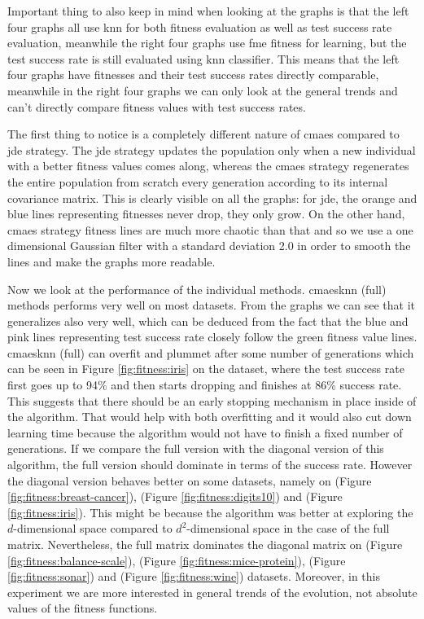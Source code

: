 \documentclass[12pt,a4paper]{report}
\begin{document}
Important thing to also keep in mind when looking at the graphs is that the left four graphs all use \ac{knn} for both fitness evaluation as well as test success rate evaluation, meanwhile the right four graphs use \ac{fme} fitness for learning, but the test success rate is still evaluated using \ac{knn} classifier. This means that the left four graphs have fitnesses and their test success rates directly comparable, meanwhile in the right four graphs we can only look at the general trends and can't directly compare fitness values with test success rates.

The first thing to notice is a completely different nature of \ac{cmaes} compared to \ac{jde} strategy. The \ac{jde} strategy updates the population only when a new individual with a better fitness values comes along, whereas the \ac{cmaes} strategy regenerates the entire population from scratch every generation according to its internal covariance matrix. This is clearly visible on all the graphs: for \ac{jde}, the orange and blue lines representing fitnesses never drop, they only grow. On the other hand, \ac{cmaes} strategy fitness lines are much more chaotic than that and so we use a one dimensional Gaussian filter with a standard deviation 2.0 in order to smooth the lines and make the graphs more readable. 

Now we look at the performance of the individual methods. \ac{cmaesknn} (full) methods performs very well on most datasets. From the graphs we can see that it generalizes also very well, which can be deduced from the fact that the blue and pink lines representing test success rate closely follow the green fitness value lines. \ac{cmaesknn} (full) can overfit and plummet after some number of generations which can be seen in Figure \ref{fig:fitness:iris} on the  dataset, where the test success rate first goes up to 94\% and then starts dropping and finishes at 86\% success rate. This suggests that there should be an early stopping mechanism in place inside of the algorithm. That would help with both overfitting and it would also cut down learning time because the algorithm would not have to finish a fixed number of generations. If we compare the full version with the diagonal version of this algorithm, the full version should dominate in terms of the success rate. However the diagonal version behaves  better on some datasets, namely on  (Figure \ref{fig:fitness:breast-cancer}),  (Figure \ref{fig:fitness:digits10}) and  (Figure \ref{fig:fitness:iris}). This might be because the algorithm was better at exploring the $d$-dimensional space compared to $d^2$-dimensional space in the case of the full matrix. Nevertheless, the full matrix dominates the diagonal matrix on  (Figure \ref{fig:fitness:balance-scale}),  (Figure \ref{fig:fitness:mice-protein}),  (Figure \ref{fig:fitness:sonar}) and  (Figure \ref{fig:fitness:wine}) datasets. Moreover, in this experiment we are more interested in general trends of the evolution, not absolute values of the fitness functions.
\end{document}

